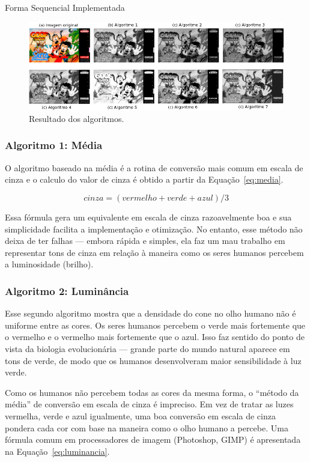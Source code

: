 \begin{subsection}{Forma Sequencial Implementada}
\begin{figure}[!h]
	\centering
	\includegraphics[width=0.95\linewidth]{figs/gray.png}
	\caption{Resultado dos algoritmos.}
	\label{fig:gray}
\end{figure}

\subsubsection{Algoritmo 1: Média}
O algoritmo baseado na média é a rotina de conversão mais comum em escala de
cinza e o calculo do valor de cinza é obtido a partir da Equação~\ref{eq:media}.

\begin{equation}
\label{eq:media}
cinza = (vermelho + verde + azul)/3
\end{equation}

Essa fórmula gera um equivalente em escala de cinza razoavelmente boa e sua
simplicidade facilita a implementação e otimização. No entanto, esse método não
deixa de ter falhas --- embora rápida e simples, ela faz um mau trabalho em
representar tons de cinza em relação à maneira como os seres humanos percebem a
luminosidade (brilho).


\subsubsection{Algoritmo 2: Luminância}
Esse segundo algoritmo mostra que a densidade do cone no olho humano não é
uniforme entre as cores. Os seres humanos percebem o verde mais fortemente que o
vermelho e o vermelho mais fortemente que o azul. Isso faz sentido do ponto de
vista da biologia evolucionária --- grande parte do mundo natural aparece em
tons de verde, de modo que os humanos desenvolveram maior sensibilidade à luz
verde.

Como os humanos não percebem todas as cores da mesma forma, o ``método da média'' de
conversão em escala de cinza é impreciso. Em vez de tratar as luzes vermelha,
verde e azul igualmente, uma boa conversão em escala de cinza pondera cada cor
com base na maneira como o olho humano a percebe. Uma fórmula comum em
processadores de imagem (Photoshop, GIMP) é apresentada na
Equação~\ref{eq:luminancia}.



\end{subsection}
